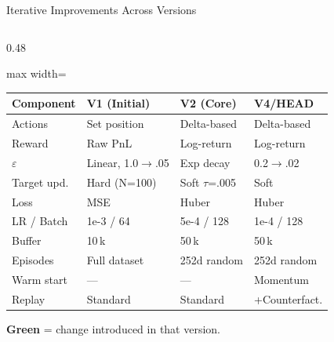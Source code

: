 \documentclass[aspectratio=169, 10pt]{beamer}
\begin{document}
\begin{frame}[shrink=5]{Iterative Improvements Across Versions}
\begin{columns}[T]

\begin{column}{0.48\textwidth}
\vspace{-0.3em}
{\tiny
\renewcommand{\arraystretch}{1.15}
\begin{adjustbox}{max width=\linewidth}
\begin{tabular}{@{}p{1.4cm}p{1.7cm}p{1.7cm}p{1.7cm}@{}}
\toprule
\textbf{Component} & \textbf{V1 (Initial)} & \textbf{V2 (Core)} & \textbf{V4/HEAD} \\
\midrule
Actions       & Set position        & \textcolor{good}{Delta-based}   & Delta-based \\
Reward        & Raw PnL             & \textcolor{good}{Log-return}    & Log-return \\
$\varepsilon$ & Linear, 1.0$\to$.05 & \textcolor{good}{Exp decay}     & \textcolor{good}{0.2$\to$.02} \\
Target upd.   & Hard (N=100)        & \textcolor{good}{Soft $\tau$=.005} & Soft \\
Loss          & MSE                 & \textcolor{good}{Huber}         & Huber \\
LR / Batch    & 1e-3 / 64           & 5e-4 / 128                     & \textcolor{good}{1e-4} / 128 \\
Buffer        & 10\,k               & 50\,k                          & 50\,k \\
Episodes      & Full dataset        & \textcolor{good}{252d random}   & 252d random \\
Warm start    & ---                 & ---                            & \textcolor{good}{Momentum} \\
Replay        & Standard            & Standard                       & \textcolor{good}{+Counterfact.} \\
\bottomrule
\end{tabular}
\end{adjustbox}}

\vspace{0.4em}
{\tiny \textcolor{good}{\textbf{Green}} = change introduced in that version.}
\end{column}


\end{columns}
\end{frame}
\end{document}
